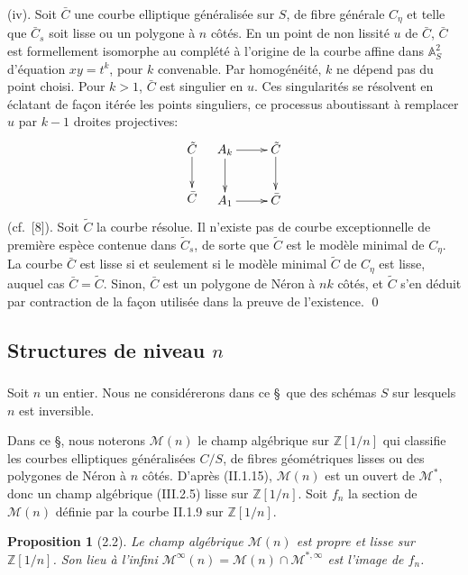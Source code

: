\documentclass[11pt,a4paper]{amsart}
\theoremstyle{plain}
\newtheorem{proposition}[theorem]{Proposition}
\theoremstyle{definition}
\newcommand{\mll}{\mathcal{M}}
\newcommand{\ZZ}{\mathbb{Z}}
\newcommand{\Af}{\mathbb{A}}
\begin{document}
(iv). Soit $\bar{C}$ une courbe elliptique g\'en\'eralis\'ee sur $S$, de fibre g\'en\'erale $C_{\eta}$ et telle que $\bar{C}_s$ soit lisse ou un polygone \`a $n$ c\^ot\'es. En un point de non lissit\'e $u$ de $\bar{C}$, $\bar{C}$ est formellement isomorphe au compl\'et\'e \`a l'origine de la courbe affine dans $\Af^2_S$ d'\'equation $xy = t^k$, pour $k$ convenable. Par homog\'en\'eit\'e, $k$ ne d\'epend pas du point choisi. Pour $k > 1$, $\bar{C}$ est singulier en $u$. Ces singularit\'es se r\'esolvent en \'eclatant de fa\c{c}on it\'er\'ee les points singuliers, ce processus aboutissant \`a remplacer $u$ par $k-1$ droites projectives:
\[
\xymatrix{
\tilde{C} \ar[d] \\ \bar{C}
}
\quad
\xymatrix{
A_k \ar[r] \ar[d] & \tilde{C} \ar[d] \\ A_1 \ar[r] & \bar{C}
}
\]
(cf.~[8]). Soit $\tilde{C}$ la courbe r\'esolue. Il n'existe pas de courbe exceptionnelle de premi\`ere esp\`ece contenue dans $\tilde{C}_s$, de sorte que $\tilde{C}$ est le mod\`ele minimal de $C_{\eta}$. La courbe $\bar{C}$ est lisse si et seulement si le mod\`ele minimal $\tilde{C}$ de $C_{\eta}$ est lisse, auquel cas $\bar{C} = \tilde{C}$. Sinon, $\bar{C}$ est un polygone de N\'eron \`a $nk$ c\^ot\'es, et $\tilde{C}$ s'en d\'eduit par contraction de la fa\c{c}on utilis\'ee dans la preuve de l'existence.
\qed


\subsection{Structures de niveau $n$}

\subsubsection{}
Soit $n$ un entier. Nous ne consid\'ererons dans ce \S\ que des sch\'emas $S$ sur lesquels $n$ est inversible.

Dans ce \S, nous noterons $\mll(n)$ le champ alg\'ebrique sur $\ZZ[1/n]$ qui classifie les courbes elliptiques g\'en\'eralis\'ees $C/S$, de fibres g\'eom\'etriques lisses ou des polygones de N\'eron \`a $n$ c\^ot\'es. D'apr\`es (II.1.15), $\mll(n)$ est un ouvert de $\mll^*$, donc un champ alg\'ebrique (III.2.5) lisse sur $\ZZ[1/n]$. Soit $f_n$ la section de $\mll(n)$ d\'efinie par la courbe II.1.9 sur $\ZZ[1/n]$.

\begin{proposition}[2.2]
Le champ alg\'ebrique $\mll(n)$ est propre et lisse sur $\ZZ[1/n]$. Son lieu \`a l'infini $\mll^{\infty}(n) = \mll(n) \cap \mll^{*,\infty}$ est l'image de $f_n$.
\end{proposition}
\end{document}
